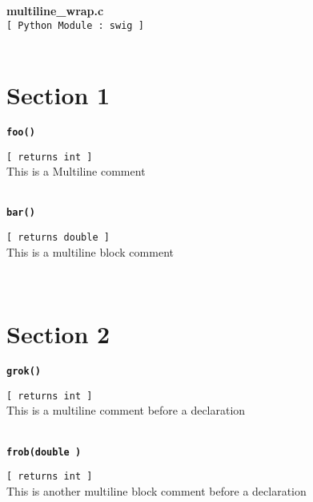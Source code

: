 \setlength{\parindent}{0.0in}
\setlength{\textwidth}{6.5in}
\setlength{\oddsidemargin}{0.0in}
\pagestyle{headings}

{\Large \bf  multiline\_wrap.c }\\
{\tt [ Python Module : swig ]  }\\
\\\section{Section 1}{\tt \bf foo() }
\\
\makebox[0.5in]{}\begin{minipage}[t]{6in}
{\tt [ returns int  ]  }\\
   This is a 
   Multiline comment
\\

\end{minipage}\\

{\tt \bf bar() }
\\
\makebox[0.5in]{}\begin{minipage}[t]{6in}
{\tt [ returns double  ]  }\\
   This is a multiline
   block comment   
\\

\end{minipage}\\

\section{Section 2}{\tt \bf grok() }
\\
\makebox[0.5in]{}\begin{minipage}[t]{6in}
{\tt [ returns int  ]  }\\
   This is a
   multiline comment
   before a declaration
\\

\end{minipage}\\

{\tt \bf frob(double ) }
\\
\makebox[0.5in]{}\begin{minipage}[t]{6in}
{\tt [ returns int  ]  }\\
   This is another multiline
   block comment before
   a declaration   
\\

\end{minipage}\\



